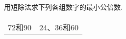 用短除法求下列各组数字的最小公倍数. \\
\begin{tabular}{cc}
72和90\hspace{16em} & 24、36和60\hspace{16em} \\[12em]

\end{tabular}

